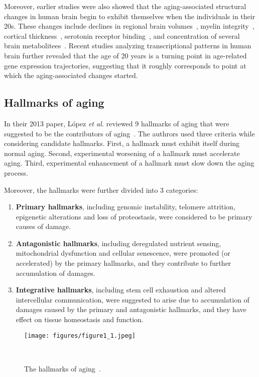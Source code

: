 Moreover, earlier studies were also showed that the aging-associated structural changes in human brain begin to exhibit themselves when the individuals in their 20s.
These changes include declines in regional brain volumes~\cite{Sowell2003}, myelin integrity~\cite{Sullivan2006}, cortical thickness~\cite{Salat2004, Magnotta1999},
serotonin receptor binding~\cite{Sheline2002}, and concentration of several brain metabolitees~\cite{Salthouse2009, Kadota2001}.
Recent studies analyzing transcriptional patterns in human brain further revealed that the age of 20 years is a turning point in age-related gene expression trajectories,
suggesting that it roughly corresponds to point at which the aging-associated changes started.

\subsection{Hallmarks of aging}
In their 2013 paper, López \textit{et al.} reviewed 9 hallmarks of aging that were suggested to be the contributors of aging~\cite{Lopez2013}.
The authrors used three criteria while considering candidate hallmarks. 
First, a hallmark must exhibit itself during normal aging.
Second, experimental worsening of a hallmark must accelerate aging.
Third, experimental enhancement of a hallmark must slow down the aging process. 

Moreover, the hallmarks were further divided into 3 categories:
\begin{enumerate}
    \item \textbf{Primary hallmarks}, including genomic instability, telomere attrition, epigenetic alterations and loss of proteostasis,
    were considered to be primary causes of damage.
    \item \textbf{Antagonistic hallmarks}, including deregulated nutrient sensing, mitochondrial dysfunction and cellular senescence,
    were promoted (or accelerated) by the primary hallmarks, and they contribute to further accumulation of damages.
    \item \textbf{Integrative hallmarks}, including stem cell exhaustion and altered intercellular communication, 
    were suggested to arise due to accumulation of damages caused by the primary and antagonistic hallmarks,
    and they have effect on tissue homeostasis and function.
\end{enumerate}

\begin{figure}[h]
    \centering
    \texttt{[image: figures/figure1\_1.jpeg]}
    \caption{The hallmarks of aging~\cite{Lopez2013}.
    }~\label{fig:fig1.1}
\end{figure}

